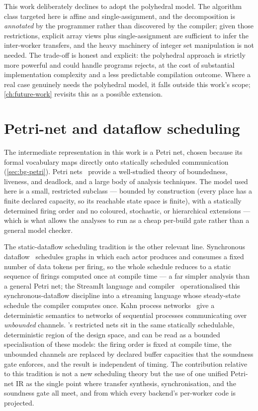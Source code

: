 This work deliberately declines to adopt the polyhedral model. The algorithm
class targeted here is affine and single-assignment, and the decomposition is
\emph{annotated} by the programmer rather than discovered by the compiler; given
those restrictions, explicit array views plus single-assignment are sufficient to
infer the inter-worker transfers, and the heavy machinery of integer set
manipulation is not needed. The trade-off is honest and explicit: the polyhedral
approach is strictly more powerful and could handle programs \nuc{} rejects, at
the cost of substantial implementation complexity and a less predictable
compilation outcome. Where a real case genuinely needs the polyhedral model, it
falls outside this work's scope; \cref{ch:future-work} revisits this as a
possible extension.

\section{Petri-net and dataflow scheduling}\label{sec:pa-petri}

The intermediate representation in this work is a Petri net, chosen because its
formal vocabulary maps directly onto statically scheduled communication
(\cref{sec:bg-petri}). Petri nets~\cite{petri1962kommunikation,murata1989petri}
provide a well-studied theory of boundedness, liveness, and deadlock, and a
large body of analysis techniques. The model used here is a small, restricted
subclass --- bounded by construction (every place has a finite declared capacity,
so its reachable state space is finite), with a statically determined firing order
and no coloured, stochastic, or hierarchical extensions --- which is what allows
the analyses to run as a cheap per-build gate rather than a general model checker.

The static-dataflow scheduling tradition is the other relevant line. Synchronous
dataflow~\cite{lee1987sdf} schedules graphs in which each actor produces and
consumes a fixed number of data tokens per firing, so the whole schedule reduces
to a static sequence of firings computed once at compile time --- a far simpler
analysis than a general Petri net; the StreamIt language and
compiler~\cite{thies2002streamit} operationalised this synchronous-dataflow
discipline into a streaming language whose steady-state schedule the compiler
computes once. Kahn process
networks~\cite{kahn1974semantics} give a deterministic semantics to networks of
sequential processes communicating over \emph{unbounded} channels. \nuc{}'s
restricted nets sit in the same statically schedulable, deterministic region of
the design space, and can be read as a bounded specialisation of these models:
the firing order is fixed at compile time, the unbounded channels are replaced by
declared buffer capacities that the soundness gate enforces, and the result is
independent of timing. The contribution
relative to this tradition is not a new scheduling theory but the use of one
unified Petri-net IR as the single point where transfer synthesis,
synchronisation, and the soundness gate all meet, and from which every backend's
per-worker code is projected.

